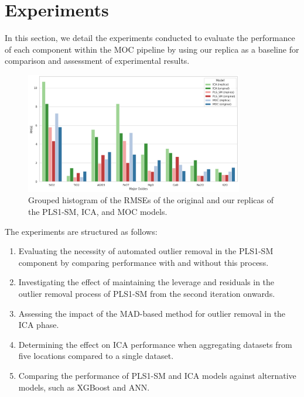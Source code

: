 \section{Experiments}\label{sec:experiments}
In this section, we detail the experiments conducted to evaluate the performance of each component within the MOC pipeline by using our replica as a baseline for comparison and assessment of experimental results.

\begin{figure}[ht]
	\centering
	\includegraphics[width=0.85\textwidth]{images/rmse_historgram.png}
	\caption{Grouped histogram of the RMSEs of the original and our replicas of the PLS1-SM, ICA, and MOC models.}
	\label{fig:rmse_histograms}
\end{figure}

The experiments are structured as follows:

\begin{enumerate}
    \item Evaluating the necessity of automated outlier removal in the PLS1-SM component by comparing performance with and without this process.
    \item Investigating the effect of maintaining the leverage and residuals in the outlier removal process of PLS1-SM from the second iteration onwards.
    \item Assessing the impact of the MAD-based method for outlier removal in the ICA phase.
    \item Determining the effect on ICA performance when aggregating datasets from five locations compared to a single dataset.
    \item Comparing the performance of PLS1-SM and ICA models against alternative models, such as XGBoost and ANN.
\end{enumerate}


